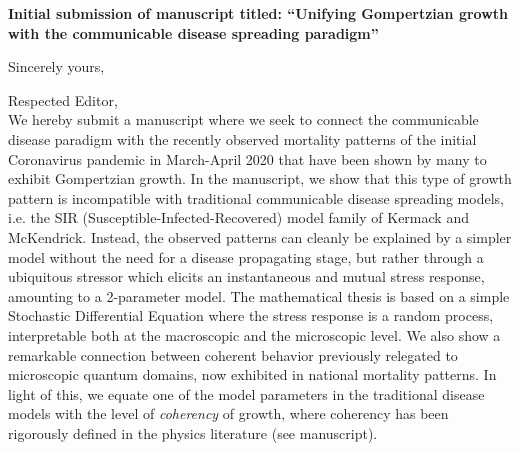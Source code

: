 \documentclass[11pt,a4paper,roman]{moderncv}
\begin{document}
\date{\today}
\opening{\textbf{Initial submission of manuscript titled: ``Unifying Gompertzian growth with the communicable disease spreading paradigm''}}
\closing{Sincerely yours, \vspace{-1em}}


\makelettertitle



Respected Editor,
\\
\vspace{1em}
We hereby submit a manuscript where we seek to connect the communicable disease paradigm with the recently observed mortality patterns of the initial Coronavirus pandemic in March-April 2020 that have been shown by many to exhibit Gompertzian growth. 
In the manuscript, we show that this type of growth pattern is incompatible with traditional communicable disease spreading models, i.e. the SIR (Susceptible-Infected-Recovered) model family of Kermack and McKendrick. Instead, the observed patterns can cleanly be explained by a simpler model without the need for a disease propagating stage, but rather through a ubiquitous stressor which elicits an instantaneous and mutual stress response, amounting to a 2-parameter model. 
The mathematical thesis is based on a simple Stochastic Differential Equation where the stress response is a random process, interpretable both at the macroscopic and the microscopic level. 
We also show a remarkable connection between coherent behavior previously relegated to microscopic quantum domains, now exhibited in national mortality patterns. In light of this, we equate one of the model parameters in the traditional disease models with the level of \emph{coherency} of growth, where coherency has been rigorously defined in the physics literature (see manuscript).
\end{document}
